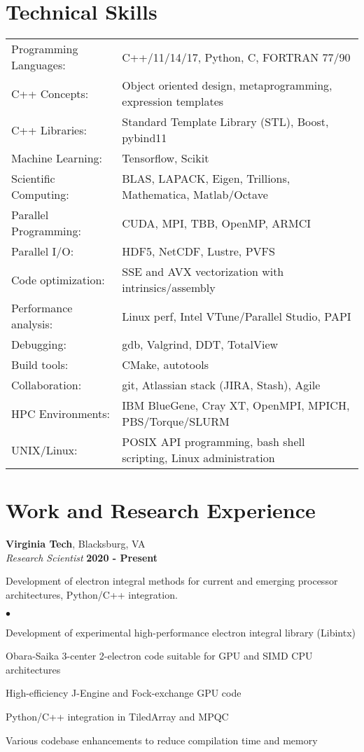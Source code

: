 \documentclass[overlap,line]{cv}
\newenvironment{list2}{
  \begin{list}{$\bullet$}{%
      \setlength{\itemsep}{0in}
      \setlength{\parsep}{0in} \setlength{\parskip}{0in}
      \setlength{\topsep}{0in} \setlength{\partopsep}{0in} 
      \setlength{\leftmargin}{0.2in}}}{\end{list}}
\begin{document}
\begin{resume}
\section{\sc Technical Skills}
\vspace{.05in}
\begin{tabular}{ l @{\hskip 1em} l }
Programming Languages: & C++/11/14/17, Python, C, FORTRAN 77/90 \\
C++ Concepts: & Object oriented design, metaprogramming, expression templates \\
C++ Libraries: & Standard Template Library (STL), Boost, pybind11 \\
Machine Learning: & Tensorflow, Scikit \\
Scientific Computing: & BLAS, LAPACK, Eigen, Trillions, Mathematica, Matlab/Octave \\
Parallel Programming: & CUDA, MPI, TBB, OpenMP, ARMCI \\
Parallel I/O: & HDF5, NetCDF, Lustre, PVFS \\
Code optimization: & SSE and AVX vectorization with intrinsics/assembly \\
Performance analysis: & Linux perf, Intel VTune/Parallel Studio, PAPI \\
Debugging: & gdb, Valgrind, DDT, TotalView \\
Build tools: & CMake, autotools \\
Collaboration: & git, Atlassian stack (JIRA, Stash), Agile \\
HPC Environments: & IBM BlueGene, Cray XT, OpenMPI, MPICH, PBS/Torque/SLURM \\
UNIX/Linux: & POSIX API programming, bash shell scripting, Linux administration \\
\end{tabular}


\section{\sc Work and Research Experience}
\vspace{.05in}
{\bf Virginia Tech}, Blacksburg, VA \\
{\it Research Scientist} \hfill {\bf 2020 - Present}

Development of electron integral methods for current and emerging processor architectures,
Python/C++ integration.
\vspace{.05in}
\begin{list2}
\item Development of experimental high-performance electron integral library (Libintx)
\item Obara-Saika 3-center 2-electron code suitable for GPU and SIMD CPU architectures
\item High-efficiency J-Engine and Fock-exchange GPU code
\item Python/C++ integration in TiledArray and MPQC
\item Various codebase enhancements to reduce compilation time and memory
\end{list2}


\end{resume}
\end{document}
